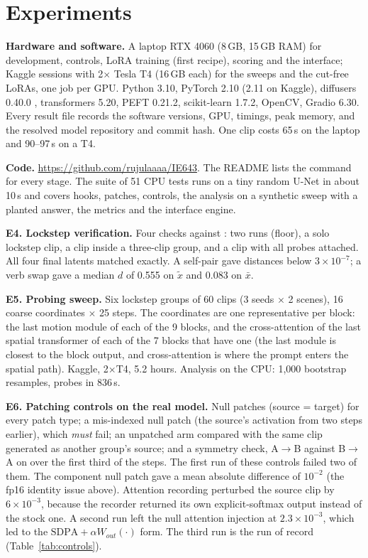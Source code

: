 \documentclass[twoside,english]{article}
\newcommand{\xs}{\bar{x}}         %
\newcommand{\xd}{\tilde{x}}       %
\begin{document}
\section{Experiments} \label{sec:exp}

\textbf{Hardware and software.} A laptop RTX 4060 (8\,GB, 15\,GB RAM) for development, controls,
LoRA training (first recipe), scoring and the interface; Kaggle sessions with 2$\times$ Tesla
T4 (16\,GB each) for the sweeps and the cut-free LoRAs, one job per GPU. Python 3.10, PyTorch
2.10 (2.11 on Kaggle), diffusers 0.40.0 \citep{hf_diffusers}, transformers 5.20, PEFT 0.21.2, scikit-learn 1.7.2,
OpenCV, Gradio 6.30. Every result file records the software versions, GPU, timings, peak memory,
and the resolved model repository and commit hash. One clip costs 65\,s on the laptop and
90--97\,s on a T4.

\textbf{Code.} \url{https://github.com/rujulaaaa/IE643}. The README lists the command for every
stage. The suite of 51 CPU tests runs on a tiny random U-Net in about 10\,s and covers hooks,
patches, controls, the analysis on a synthetic sweep with a planted answer, the metrics and the
interface engine.

\textbf{E4. Lockstep verification.} Four checks against : two  runs
(floor), a solo lockstep clip, a clip inside a three-clip group, and a clip with all probes
attached. All four final latents matched exactly. A self-pair gave distances below
$3\times10^{-7}$; a verb swap gave a median $d$ of 0.555 on $\xd$ and 0.083 on $\xs$.

\textbf{E5. Probing sweep.} Six lockstep groups of 60 clips (3 seeds $\times$ 2 scenes), 16 coarse
coordinates $\times$ 25 steps. The coordinates are one representative per block: the last motion
module of each of the 9 blocks, and the cross-attention of the last spatial transformer of each of
the 7 blocks that have one (the last module is closest to the block output, and cross-attention
is where the prompt enters the spatial path). Kaggle, 2$\times$T4, 5.2 hours. Analysis on the CPU:
1{,}000 bootstrap resamples, probes in 836\,s.

\textbf{E6. Patching controls on the real model.} Null patches (source = target) for every patch
type; a mis-indexed null patch (the source's activation from two steps earlier), which
\emph{must} fail; an unpatched arm compared with the same clip generated as another group's
source; and a symmetry check, A$\to$B against B$\to$A on  over the first third
of the steps. The first run of these controls failed two of them. The component null patch
gave a mean absolute difference of $10^{-2}$ (the fp16 identity issue above). Attention recording
perturbed the source clip by $6\times10^{-3}$, because the recorder returned its own
explicit-softmax output instead of the stock one. A second run left the null attention
injection at $2.3\times10^{-3}$, which led to the $\mathrm{SDPA} + \alpha W_{out}(\cdot)$ form. The
third run is the run of record (Table~\ref{tab:controls}).
\end{document}
